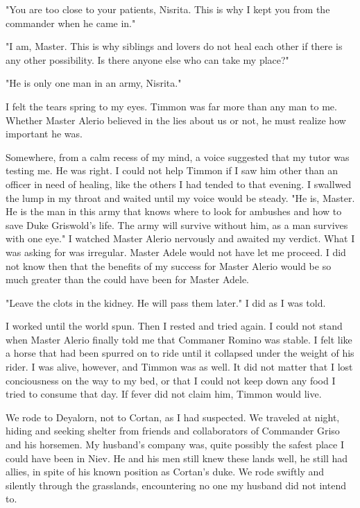 \documentclass{article}
\begin{document}
"You are too close to your patients, Nisrita. This is why I kept you from the commander when he came in."

"I am, Master. This is why siblings and lovers do not heal each other if there is any other possibility. Is there anyone else who can take my place?"

"He is only one man in an army, Nisrita."

I felt the tears spring to my eyes. Timmon was far more than any man to me. Whether Master Alerio believed in the lies about us or not, he must realize how important he was. 

Somewhere, from a calm recess of my mind, a voice suggested that my tutor was testing me. He was right. I could not help Timmon if I saw him other than an officer in need of healing, like the others I had tended to that evening. I swallwed the lump in my throat and waited until my voice would be steady. "He is, Master. He is the man in this army that knows where to look for ambushes and how to save Duke Griswold's life. The army will survive without him, as a man survives with one eye." I watched Master Alerio nervously and awaited my verdict. What I was asking for was irregular. Master Adele would not have let me proceed. I did not know then that the benefits of my success for Master Alerio would be so much greater than the could have been for Master Adele.

"Leave the clots in the kidney. He will pass them later." I did as I was told. 

I worked until the world spun. Then I rested and tried again. I could not stand when Master Alerio finally told me that Commaner Romino was stable. I felt like a horse that had been spurred on to ride until it collapsed under the weight of his rider. I was alive, however, and Timmon was as well. It did not matter that I lost conciousness on the way to my bed, or that I could not keep down any food I tried to consume that day. If fever did not claim him, Timmon would live. 

\vspace{.5cm}

We rode to Deyalorn, not to Cortan, as I had suspected. We traveled at night, hiding and seeking shelter from friends and collaborators of Commander Griso and his horsemen. My husband's company was, quite possibly the safest place I could have been in Niev. He and his men still knew these lands well, he still had allies, in spite of his known position as Cortan's duke. We rode swiftly and silently through the grasslands, encountering no one my husband did not intend to.
\end{document}
